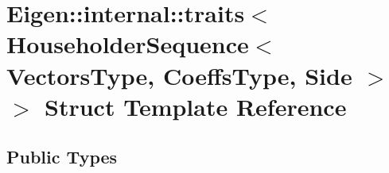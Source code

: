 \hypertarget{struct_eigen_1_1internal_1_1traits_3_01_householder_sequence_3_01_vectors_type_00_01_coeffs_type_00_01_side_01_4_01_4}{}\section{Eigen\+:\+:internal\+:\+:traits$<$ Householder\+Sequence$<$ Vectors\+Type, Coeffs\+Type, Side $>$ $>$ Struct Template Reference}
\label{struct_eigen_1_1internal_1_1traits_3_01_householder_sequence_3_01_vectors_type_00_01_coeffs_type_00_01_side_01_4_01_4}
\subsection*{Public Types}
